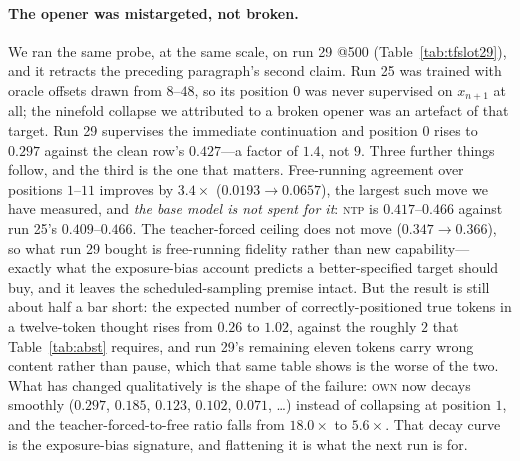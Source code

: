 \documentclass{article} %
\begin{document}
\paragraph{The opener was mistargeted, not broken.} We ran the same probe, at the same scale, on
run 29 @500 (Table~\ref{tab:tfslot29}), and it retracts the preceding paragraph's second claim.
Run 25 was trained with oracle offsets drawn from $8$--$48$, so its position $0$ was never
supervised on $x_{n+1}$ at all; the ninefold collapse we attributed to a broken opener was an
artefact of that target. Run 29 supervises the immediate continuation and position $0$ rises to
$0.297$ against the clean row's $0.427$---a factor of $1.4$, not $9$. Three further things follow,
and the third is the one that matters. Free-running agreement over positions $1$--$11$ improves by
$3.4\times$ ($0.0193 \to 0.0657$), the largest such move we have measured, and \emph{the base model
is not spent for it}: \textsc{ntp} is $0.417$--$0.466$ against run 25's $0.409$--$0.466$. The
teacher-forced ceiling does not move ($0.347 \to 0.366$), so what run 29 bought is free-running
fidelity rather than new capability---exactly what the exposure-bias account predicts a
better-specified target should buy, and it leaves the scheduled-sampling premise intact. But the
result is still about half a bar short: the expected number of correctly-positioned true tokens in
a twelve-token thought rises from $0.26$ to $1.02$, against the roughly $2$ that Table~\ref{tab:abst}
requires, and run 29's remaining eleven tokens carry wrong content rather than pause, which that
same table shows is the worse of the two. What has changed qualitatively is the shape of the
failure: \textsc{own} now decays smoothly ($0.297$, $0.185$, $0.123$, $0.102$, $0.071$, \ldots)
instead of collapsing at position $1$, and the teacher-forced-to-free ratio falls from $18.0\times$
to $5.6\times$. That decay curve is the exposure-bias signature, and flattening it is what the next
run is for.
\end{document}
